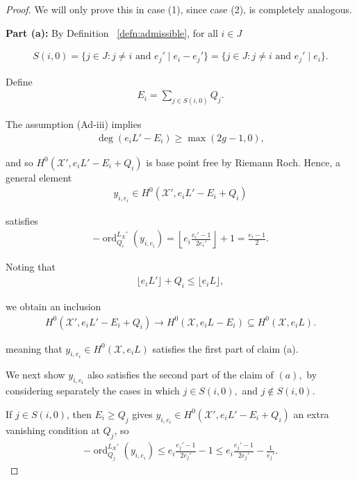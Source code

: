 \documentclass{amsart}
\theoremstyle{plain}
\theoremstyle{definition}
\theoremstyle{remark}
\numberwithin{equation}{section}
\newcommand \sx{\mathscr X}
\DeclareMathOperator{\ord}{ord}
\newcommand \subhalf[1]{\frac{{#1} - 1}{2{#1}}}
\newcommand{\halfcan}{L}
\begin{document}
\begin{proof}
We will only prove this in case (1), since case (2), is completely analogous.  

{\bf Part (a):} 
By Definition ~\ref{defn:admissible}, for all $i\in J$

\begin{align*}
	S(i,0) = \{j \in J : j \neq i \text{ and }e_j' \mid e_i-e_j'\} = \{j \in J : j \neq i \text{ and }e_j' \mid e_i\}.
\end{align*}

\noindent
Define
\begin{align*}
	E_i = \sum_{j \in S(i,0)}^{}Q_j.
\end{align*}

\noindent
The assumption (Ad-iii) implies
\begin{align*}
	\deg \left( e_i L' - E_i \right) \geq \max(2g - 1,0),
\end{align*}

\noindent
and so $H^0(\sx', e_iL'-E_i + Q_i)$ is base point free by 
Riemann Roch.
Hence, a general element
\begin{align*}
	y_{i, e_i} \in H^0(\sx', e_iL'-E_i + Q_i)
\end{align*}

\noindent
satisfies
\begin{align*}
	-\ord_{Q_i}
^{\halfcan_X'}(y_{i, e_i}) = \left\lfloor e_i \subhalf {e_i'} \right\rfloor + 1 =
	\frac{e_i - 1}{2}.
\end{align*}


Noting that
\begin{align*}
	\lfloor e_i L' \rfloor + Q_i \leq \lfloor e_i L \rfloor,
\end{align*}

\noindent
we obtain an inclusion
\begin{align*}
	H^0(\sx', e_iL'-E_i + Q_i) \rightarrow H^0(\sx, e_iL - E_i) \subseteq 
H^0(\sx, e_iL).
\end{align*}

\noindent
meaning that $y_{i,e_i}\in H^0(\sx,e_iL)$ satisfies the first part of claim (a).


We next show $y_{i, e_i}$ also satisfies the second part of the
claim of $(a),$ by considering separately the cases in which $j
\in S(i, 0),$ and $j \notin S(i,0)$.

If $j \in S(i,0)$, then $E_i \geq Q_j$ gives $y_{i, e_i} \in H^0
(\sx', e_iL'-E_i + Q_i)$ an extra vanishing condition at $Q_j$, so
\begin{align*}
	-\ord_{Q_j}
^{\halfcan_X'}(y_{i, e_i}) \leq e_i\subhalf {e_j'} - 1 \leq e_i 
	\subhalf{e_j'} - \frac{1}{e_j'}.
\end{align*}


\end{proof}
\end{document}
